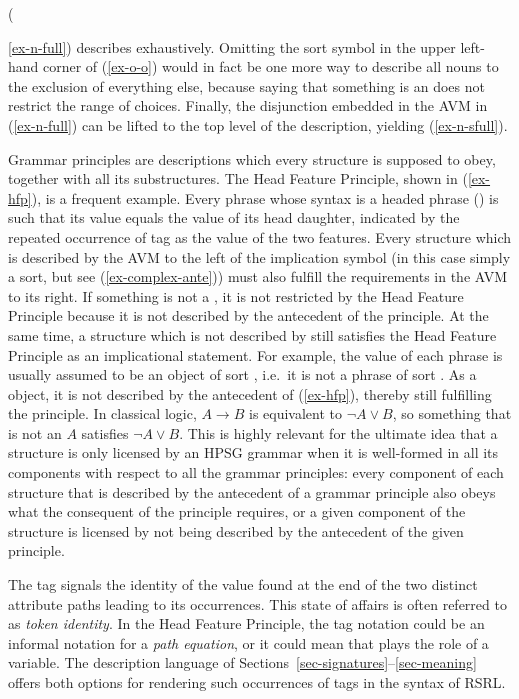 \documentclass[output=paper,biblatex,babelshorthands,newtxmath,draftmode,colorlinks,citecolor=brown]{langscibook}
\begin{document}
({\ref{ex-n-full}) describes exhaustively. Omitting the sort
  symbol  in the upper left-hand corner of (\ref{ex-o-o})
  would in fact be one more way to describe all nouns to the exclusion of
  everything else,
  because saying that something is an  does not restrict
  the range of choices. Finally, the disjunction
  embedded in the AVM in (\ref{ex-n-full}) can be lifted to
the top level of the description, yielding (\ref{ex-n-sfull}).


Grammar principles are descriptions which every structure is supposed
to obey, together with all its substructures. The Head Feature
Principle, shown in (\ref{ex-hfp}), is a frequent example. Every
phrase whose syntax is a headed phrase () is such that its
 value equals the  value of its head
daughter, indicated by the repeated occurrence of tag  as the
value of the two  features.  Every structure which is
described by the AVM to the left of the implication symbol (in this
case simply a sort, but see (\ref{ex-complex-ante})) must also
fulfill the requirements in the AVM to its right. If something is not
a , it is
not restricted by the Head Feature Principle because it is not described by the
antecedent of the principle. At the same time, a structure which
is not described by  still satisfies
the Head Feature Principle as an implicational statement. For example,
the  value of each phrase is usually assumed to be an
object of sort , i.e.\ it is not a phrase of sort
. As a
 object, it is not described by the antecedent of
(\ref{ex-hfp}), thereby still fulfilling the principle. In classical
logic, $A \rightarrow B$ is equivalent to $\neg A \vee B$, so something
that is not an $A$ satisfies $\neg A \vee B$. This is highly relevant for the
ultimate idea that a structure is only licensed by an HPSG grammar when
it is well-formed in all its components with respect to all the grammar
principles: every component of each structure that
is described by the antecedent of a grammar principle also obeys what
the consequent of the principle requires, or a given component of the
structure is licensed by not being described by the antecedent of the
given principle.

The tag  signals the identity of the value found at the end of
the two distinct attribute paths leading to its occurrences. This state
of affairs is often referred to as \emph{token identity}. In
the Head Feature Principle, the tag notation
could be an informal notation for a \emph{path equation}, or it could mean
that  plays the role of a variable. The description language of
Sections~\ref{sec-signatures}--\ref{sec-meaning} offers both options for
rendering such occurrences of tags in the syntax of RSRL.

}
\end{document}

